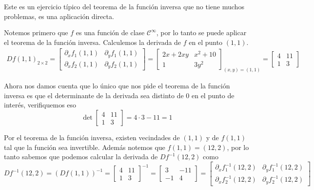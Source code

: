 \documentclass[a4paper,oneside,10.5pt]{article}
\begin{document}
\begin{sol}
    Este es un ejercicio típico del teorema de la función inversa que no tiene muchos problemas, es una aplicación directa.

    Notemos primero que $f$ es una función de clase $\mathcal{C}^\infty$, por lo tanto se puede aplicar el teorema de la función inversa. Calculemos la derivada de $f$ en el punto $(1, 1)$.
    \begin{align*}
        {Df(1, 1)}_{2 \times 2} = \begin{bmatrix}
            \partial_x f_1(1, 1) & \partial_y f_1(1, 1)\\
            \partial_x f_2(1, 1) & \partial_y f_2(1, 1)
        \end{bmatrix} = \begin{bmatrix}
            2x + 2xy & x^2 + 10\\ 1 & 3y^2
        \end{bmatrix}_{(x, y) = (1, 1)} = \begin{bmatrix}
            4 & 11\\
            1 & 3
        \end{bmatrix}
    \end{align*}

    Ahora nos damos cuenta que lo único que nos pide el teorema de la función inversa es que el determinante de la derivada sea distinto de $0$ en el punto de interés, verifiquemos eso
    \begin{equation*}
        \det \begin{bmatrix}
            4 & 11\\
            1 & 3
        \end{bmatrix} = 4 \cdot 3 - 11 = 1
    \end{equation*}

    Por el teorema de la función inversa, existen vecindades de $(1, 1)$ y de $f(1, 1)$ tal que la función sea invertible. Además notemos que $f(1, 1) = (12, 2)$, por lo tanto sabemos que podemos calcular la derivada de $Df^{-1}(12, 2)$ como
    \begin{equation*}
        Df^{-1}(12, 2) = {(Df(1, 1))}^{-1} = \begin{bmatrix}
            4 & 11\\
            1 & 3
        \end{bmatrix}^{-1} = \begin{bmatrix}
            3 & -11\\
            -1 & 4
        \end{bmatrix} = \begin{bmatrix}
            \partial_x f^{-1}_1(12, 2) & \partial_y f^{-1}_1(12, 2)\\
            \partial_x f^{-1}_2(12, 2) & \partial_y f^{-1}_2(12, 2)
        \end{bmatrix}
    \end{equation*}
\end{sol}
\end{document}
